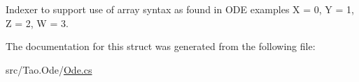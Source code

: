 Indexer to support use of array syntax as found in ODE examples X = 0, Y = 1, Z = 2, W = 3. 



The documentation for this struct was generated from the following file:\begin{DoxyCompactItemize}
\item 
src/Tao.Ode/\hyperlink{_ode_8cs}{Ode.cs}\end{DoxyCompactItemize}

